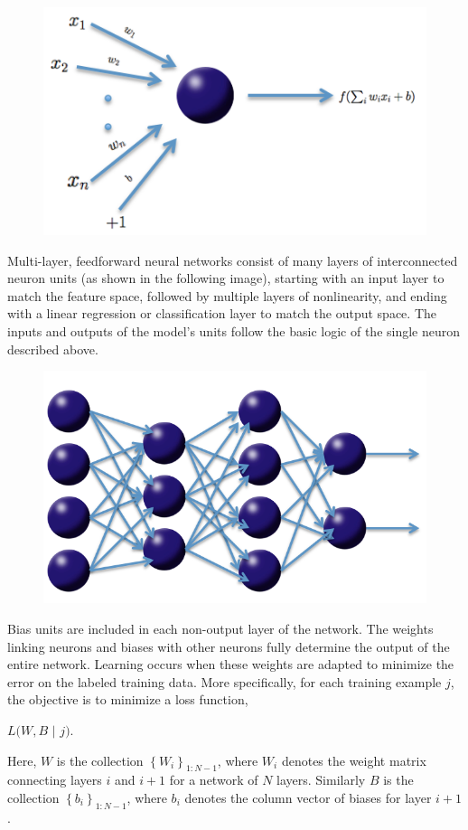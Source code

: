 \begin{figure}[h]
\centering
\includegraphics[scale=0.7]{neuron.png}
\end{figure}

Multi-layer, feedforward neural networks consist of many layers of interconnected neuron units (as shown in the following image), starting with an input layer to match the feature space, followed by multiple layers of nonlinearity, and ending with a linear regression or classification layer to match the output space. The inputs and outputs of the model's units follow the basic logic of the single neuron described above. 

\begin{figure}[ht]
\centering
\includegraphics[scale=0.5]{net.png}
\end{figure}

Bias units are included in each non-output layer of the network. The weights linking neurons and biases with other neurons fully determine the output of the entire network. Learning occurs when these weights are adapted to minimize the error on the labeled training data. More specifically, for each training example $j$, the objective is to minimize a loss function, 
\begin{center}
$L(W,B$ $|$ $j)$.
\end{center}
Here, $W$ is the collection $\left\{W_i\right\}_{1:N-1}$, where $W_i$ denotes the weight matrix connecting layers $i$ and $i+1$ for a network of $N$ layers. Similarly $B$ is the collection $\left\{b_i\right\}_{1:N-1}$, where $b_i$ denotes the column vector of biases for layer $i+1$.

